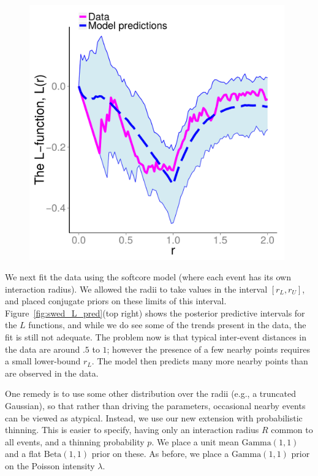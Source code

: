\documentclass{statsoc}
\begin{document}
\begin{figure}
\begin{minipage}[h]{0.76\linewidth}
\begin{minipage}[h]{0.49\linewidth}
  \end{minipage}
  \begin{minipage}[h]{0.49\linewidth}
  \centering
  \includegraphics[width=0.98\textwidth]{figs/Jfunc_postpred_R10/swed_gibbs_Lfunc.pdf}
  \end{minipage}
  \end{minipage}
  \end{figure}
We next fit the data using the softcore model 
(where each \matern event has its own interaction radius). 
We allowed the radii to take values in the interval $[r_L,r_U]$, and placed conjugate priors on these limits of this interval.
Figure~\ref{fig:swed_L_pred}(top right) shows the posterior predictive intervals for the $L$ functions, and while we do see some of the trends present
in the data, the fit is still not adequate. The problem now is that typical inter-event distances in the data are around $.5$ to $1$; however the 
presence of a few nearby points requires a small lower-bound $r_L$. 
The model then predicts many more nearby points than are observed in the data.

One remedy is to use some other distribution over the radii (e.g., a truncated Gaussian),
so that rather than driving the \matern parameters, occasional nearby events can be viewed as atypical.
Instead, we use our new extension with probabilistic thinning. This is easier to specify,
having only an interaction radius $R$ common to all \matern events, and a thinning probability $p$.
We place a unit mean $\text{Gamma}(1,1)$ %
and a flat $\text{Beta}(1,1)$ prior on these.
As before, we place a  $\text{Gamma}(1,1)$ prior on the Poisson intensity $\lambda$.
\end{document}
